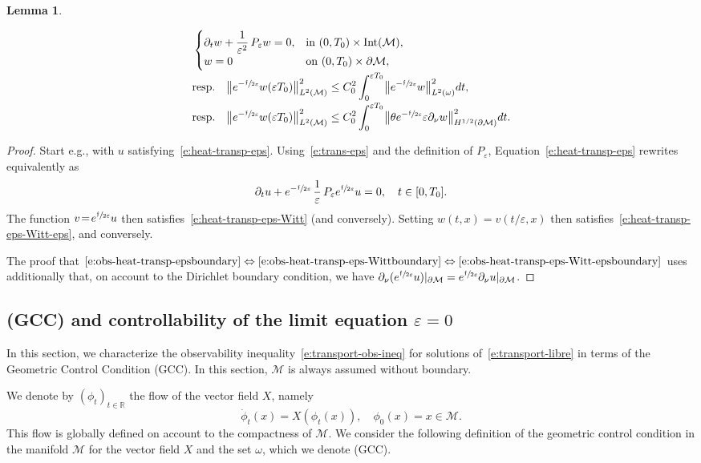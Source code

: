 \documentclass[11pt]{article}
\newcommand{\eg}{e.g.,\xspace}
\newcommand{\resp}{resp.\xspace}
\numberwithin{equation}{section}
\newcommand{\pGCC}{\textup{(GCC)}\xspace}
\newtheorem{lemma}{Lemma}[section]
\theoremstyle{definition}
\newcommand{\M}{\ensuremath{\mathcal M}}
\newcommand{\mb}[1]{\ensuremath{\mathbb{#1}}}
\newcommand{\R}{{\mb{R}}}
\newcommand{\f}{\ensuremath{\mathfrak{f}}}
\DeclareMathOperator{\Int}{Int}
\newcommand\bnp{\begin{proof}}
\newcommand\enp{\end{proof}}
\newcommand\bnor[2]{\bigl\|#1\bigr\|_{#2}}
\let\d\partial
\let\eps\varepsilon
\begin{document}
\begin{lemma}
\begin{enumerate}
\begin{align}
\label{e:heat-transp-eps-Witt-eps}
&\begin{cases}
\partial_t w + \dfrac{1}{\eps^2}\,P_\eps w =0, & \text{in } (0,T_0)\times\Int(\M), \\
w = 0 & \text{on } (0,T_0)\times \d\M,
\end{cases}
\\[-2pt]
&\text{\resp }\quad \bnor{e^{-\sfrac{\f}{2\eps}}w(\eps T_0)}{L^2(\M)}^2 \leq C_0^2\int_0^{\eps T_0}\bnor{e^{-\sfrac{\f}{2\eps}}w}{L^2(\omega)}^2 dt,\nonumber \\[-2pt]
\label{e:obs-heat-transp-eps-Witt-epsboundary}
&\text{\resp } \quad \bnor{e^{-\sfrac{\f}{2\eps}}w(\eps T_0)}{L^2(\M)}^2 \leq C_0^2\int_0^{\eps T_0}\bnor{\theta e^{-\sfrac{\f}{2\eps}} \eps \partial_{\nu}w}{H^{1/2}(\d\M)}^2 dt.
\end{align}
\end{enumerate}
\end{lemma}
\bnp
Start \eg with $u$ satisfying~\eqref{e:heat-transp-eps}.
Using~\eqref{e:trans-eps} and the definition of $P_\eps$, Equation~\eqref{e:heat-transp-eps} rewrites equivalently as\vspace*{-3pt}
\[
\partial_t u + e^{-\sfrac{\f}{2\eps}}\, \frac{1}{\eps}\,P_\eps e^{\sfrac{\f}{2\eps}} u=0, \quad t \in [0,T_0].
\]
The function $v\!=\! e^{\sfrac{\f}{2\eps}} u$ then satisfies~\eqref{e:heat-transp-eps-Witt} (and conversely). Setting $w(t,x) \!=\! v(t/\eps, x)$ then satisfies~\eqref{e:heat-transp-eps-Witt-eps}, and conversely.

The proof that $\eqref{e:obs-heat-transp-epsboundary}\Leftrightarrow\eqref{e:obs-heat-transp-eps-Wittboundary}\Leftrightarrow\eqref{e:obs-heat-transp-eps-Witt-epsboundary}$ uses additionally that, on account to the Dirichlet boundary condition, we have $\d_\nu(e^{\sfrac{\f}{2\eps}} u) |_{\d\M} =e^{\sfrac{\f}{2\eps}} \d_\nu u |_{\d\M}$.
\enp

\subsection{\pGCC and controllability of the limit equation $\eps=0$}
\label{s:GCC}
In this section, we characterize the observability inequality~\eqref{e:transport-obs-ineq} for solutions of~\eqref{e:transport-libre} in terms of the Geometric Control Condition \pGCC. In this section, $\M$ is always assumed without boundary.

We denote by $(\phi_t)_{t\in \R}$ the flow of the vector field $X$, namely\vspace*{-3pt}
\begin{equation}
\label{e:def-flot}
\dot{\phi}_t(x) = X(\phi_t(x)),\quad \phi_0(x) = x \in \M.
\end{equation}
This flow is globally defined on account to the compactness of $\M$.
We consider the following definition of the geometric control condition in the manifold $\M$ for the vector field $X$ and the set $\omega$, which we denote \pGCC.
\end{document}
